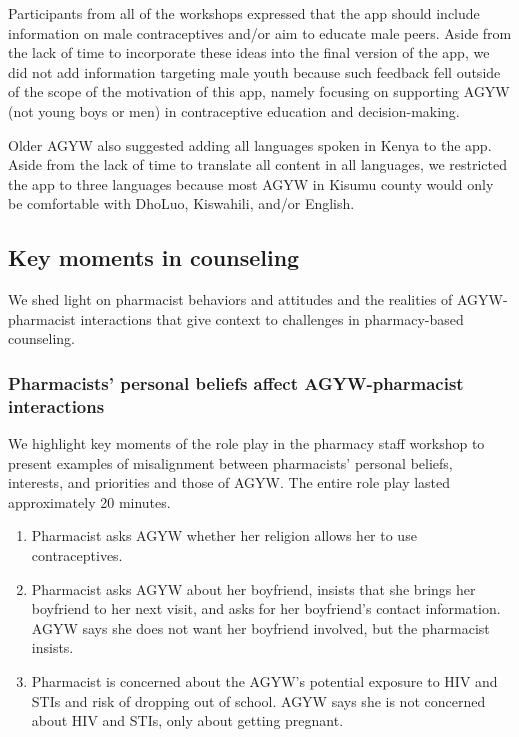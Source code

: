 Participants from all of the workshops expressed that the app should include information on male contraceptives and/or aim to educate male peers. Aside from the lack of time to incorporate these ideas into the final version of the app, we did not add information targeting male youth because such feedback fell outside of the scope of the motivation of this app, namely focusing on supporting AGYW (not young boys or men) in contraceptive education and decision-making. 

Older AGYW also suggested adding all languages spoken in Kenya to the app. Aside from the lack of time to translate all content in all languages, we restricted the app to three languages because most AGYW in Kisumu county would only be comfortable with DhoLuo, Kiswahili, and/or English.

\subsection{Key moments in counseling} 

We shed light on pharmacist behaviors and attitudes and the realities of AGYW-pharmacist interactions that give context to challenges in pharmacy-based counseling. 

\subsubsection{Pharmacists’ personal beliefs affect AGYW-pharmacist interactions} 

We highlight key moments of the role play in the pharmacy staff workshop  to present examples of misalignment between pharmacists’ personal beliefs, interests, and priorities and those of AGYW. The entire role play lasted approximately 20 minutes.

\begin{enumerate}
\item Pharmacist asks AGYW whether her religion allows her to use contraceptives.
\item Pharmacist asks AGYW about her boyfriend, insists that she brings her boyfriend to her next visit, and asks for her boyfriend’s contact information. AGYW says she does not want her boyfriend involved, but the pharmacist insists.
\item Pharmacist is concerned about the AGYW’s potential exposure to HIV and STIs and risk of dropping out of school. AGYW says she is not concerned about HIV and STIs, only about getting pregnant.
\end{enumerate}

